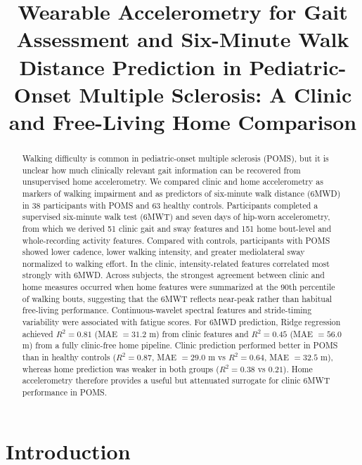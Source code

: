 \documentclass{article}
\begin{document}
\title{Wearable Accelerometry for Gait Assessment and Six-Minute Walk Distance Prediction in Pediatric-Onset Multiple Sclerosis: A Clinic and Free-Living Home Comparison}




\maketitle

\begin{abstract}
Walking difficulty is common in pediatric-onset multiple sclerosis (POMS), but it is unclear how much clinically relevant gait information can be recovered from unsupervised home accelerometry. We compared clinic and home accelerometry as markers of walking impairment and as predictors of six-minute walk distance (6MWD) in 38 participants with POMS and 63 healthy controls. Participants completed a supervised six-minute walk test (6MWT) and seven days of hip-worn accelerometry, from which we derived 51 clinic gait and sway features and 151 home bout-level and whole-recording activity features. Compared with controls, participants with POMS showed lower cadence, lower walking intensity, and greater mediolateral sway normalized to walking effort. In the clinic, intensity-related features correlated most strongly with 6MWD. Across subjects, the strongest agreement between clinic and home measures occurred when home features were summarized at the 90th percentile of walking bouts, suggesting that the 6MWT reflects near-peak rather than habitual free-living performance. Continuous-wavelet spectral features and stride-timing variability were associated with fatigue scores.
For 6MWD prediction, Ridge regression achieved $R^2 = 0.81$ (MAE $= 31.2$ m) from clinic features and $R^2 = 0.45$ (MAE $= 56.0$ m) from a fully clinic-free home pipeline. Clinic prediction performed better in POMS than in healthy controls ($R^2 = 0.87$, MAE $= 29.0$ m vs $R^2 = 0.64$, MAE $= 32.5$ m), whereas home prediction was weaker in both groups ($R^2 = 0.38$ vs $0.21$). Home accelerometry therefore provides a useful but attenuated surrogate for clinic 6MWT performance in POMS.
\end{abstract}



\section{Introduction}\label{sec:intro}
\end{document}
